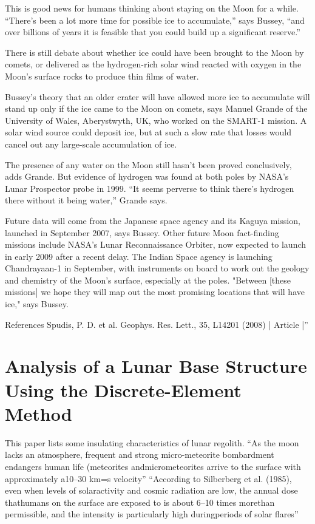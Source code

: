 \documentclass[prl,onecolumn]{revtex4-1}  %
\begin{document}
This is good news for humans thinking about staying on the Moon for a while. “There’s been a lot more time for possible ice to accumulate,” says Bussey, “and over billions of years it is feasible that you could build up a significant reserve.”

There is still debate about whether ice could have been brought to the Moon by comets, or delivered as the hydrogen-rich solar wind reacted with oxygen in the Moon’s surface rocks to produce thin films of water.

Bussey’s theory that an older crater will have allowed more ice to accumulate will stand up only if the ice came to the Moon on comets, says Manuel Grande of the University of Wales, Aberystwyth, UK, who worked on the SMART-1 mission. A solar wind source could deposit ice, but at such a slow rate that losses would cancel out any large-scale accumulation of ice.

The presence of any water on the Moon still hasn’t been proved conclusively, adds Grande. But evidence of hydrogen was found at both poles by NASA’s Lunar Prospector probe in 1999. “It seems perverse to think there’s hydrogen there without it being water,” Grande says.

Future data will come from the Japanese space agency and its Kaguya mission, launched in September 2007, says Bussey. Other future Moon fact-finding missions include NASA’s Lunar Reconnaissance Orbiter, now expected to launch in early 2009 after a recent delay. The Indian Space agency is launching Chandrayaan-1 in September, with instruments on board to work out the geology and chemistry of the Moon’s surface, especially at the poles. "Between [these missions] we hope they will map out the most promising locations that will have ice," says Bussey. 

    References
        Spudis, P. D. et al. Geophys. Res. Lett., 35, L14201 (2008) | Article |''


\section{Analysis of a Lunar Base Structure Using the Discrete-Element Method}
This paper lists some insulating characteristics of lunar regolith.
``As the moon lacks an atmosphere, frequent and strong micro-meteorite bombardment endangers human life (meteorites andmicrometeorites arrive to the surface with approximately a10–30 km=s velocity''\citep{Toth}
``According to Silberberg et al. (1985), even when levels of solaractivity and cosmic radiation are low, the annual dose thathumans on the surface are exposed to is about 6–10 times morethan permissible, and the intensity is particularly high duringperiods of solar flares''\citep{Toth}
\end{document}
